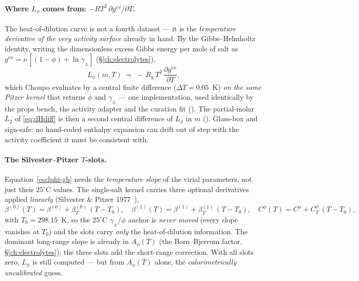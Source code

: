 \documentclass[11pt,a4paper]{article}
\newcommand{\Rgas}{R_{\!\mathrm{g}}}                %
\begin{document}
\paragraph{Where $L_\phi$ comes from: $-RT^2\,\partial g^{ex}/\partial T$.}
The heat-of-dilution curve is not a fourth dataset --- it is the
\emph{temperature derivative of the very activity surface} already in hand.
By the Gibbs--Helmholtz identity, writing the dimensionless excess Gibbs
energy per mole of salt as $g^{ex}=\nu\,[(1-\phi)+\ln\gamma_\pm]$
(\S\ref{ch:electrolytes}),
\begin{equation}
   L_\phi(m,T) \;=\; -\,\Rgas\,T^{2}\,\frac{\partial g^{ex}}{\partial T},
   \label{eq:lphi-gh}
\end{equation}
which Choupo evaluates by a central finite difference ($\Delta T=0.05$~K)
\emph{on the same Pitzer kernel} that returns $\phi$ and $\gamma_\pm$ ---
one implementation, used identically by the props bench, the activity
adapter and the curation fit ().  The
partial-molar $\overline{L}_2$ of \eqref{eq:dHdiff} is then a second
central difference of $L_\phi$ in $m$
().  Glass-box and sign-safe: no
hand-coded enthalpy expansion can drift out of step with the activity
coefficient it must be consistent with.

\paragraph{The Silvester--Pitzer $T$-slots.}  Equation~\eqref{eq:lphi-gh}
needs the \emph{temperature slope} of the virial parameters, not just their
$25^\circ$C values.  The single-salt kernel carries three optional
derivatives applied \emph{linearly} (Silvester \& Pitzer
1977~\cite{SilvesterPitzer1977}),
\begin{equation}
   \beta^{(0)}(T)=\beta^{(0)}+\beta^{(0)}_T\,(T-T_{\!0}),\quad
   \beta^{(1)}(T)=\beta^{(1)}+\beta^{(1)}_T\,(T-T_{\!0}),\quad
   C^\phi(T)=C^\phi+C^\phi_T\,(T-T_{\!0}),
   \label{eq:silvester-slots}
\end{equation}
with $T_{\!0}=298.15$~K, so the $25^\circ$C $\gamma_\pm$/$\phi$ anchor is
\emph{never moved} (every slope vanishes at $T_{\!0}$) and the slots carry
\emph{only} the heat-of-dilution information.  The dominant long-range
slope is already in $A_\phi(T)$ (the Born--Bjerrum factor,
\S\ref{ch:electrolytes}); the three slots add the short-range correction.
With all slots zero, $L_\phi$ is still computed --- but from $A_\phi(T)$
alone, the \emph{calorimetrically uncalibrated} guess.
\end{document}
